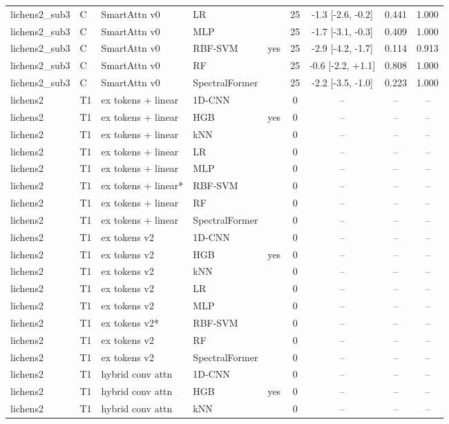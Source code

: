 \begin{tabular}{lllllcccc}
lichens2_sub3 & C & SmartAttn v0 & LR &  & 25 & -1.3 [-2.6, -0.2] & 0.441 & 1.000 \\
lichens2_sub3 & C & SmartAttn v0 & MLP &  & 25 & -1.7 [-3.1, -0.3] & 0.409 & 1.000 \\
lichens2_sub3 & C & SmartAttn v0 & RBF-SVM & yes & 25 & -2.9 [-4.2, -1.7] & 0.114 & 0.913 \\
lichens2_sub3 & C & SmartAttn v0 & RF &  & 25 & -0.6 [-2.2, +1.1] & 0.808 & 1.000 \\
lichens2_sub3 & C & SmartAttn v0 & SpectralFormer &  & 25 & -2.2 [-3.5, -1.0] & 0.223 & 1.000 \\
lichens2 & T1 & ex tokens + linear & 1D-CNN &  & 0 & -- & -- & -- \\
lichens2 & T1 & ex tokens + linear & HGB & yes & 0 & -- & -- & -- \\
lichens2 & T1 & ex tokens + linear & kNN &  & 0 & -- & -- & -- \\
lichens2 & T1 & ex tokens + linear & LR &  & 0 & -- & -- & -- \\
lichens2 & T1 & ex tokens + linear & MLP &  & 0 & -- & -- & -- \\
lichens2 & T1 & ex tokens + linear* & RBF-SVM &  & 0 & -- & -- & -- \\
lichens2 & T1 & ex tokens + linear & RF &  & 0 & -- & -- & -- \\
lichens2 & T1 & ex tokens + linear & SpectralFormer &  & 0 & -- & -- & -- \\
lichens2 & T1 & ex tokens v2 & 1D-CNN &  & 0 & -- & -- & -- \\
lichens2 & T1 & ex tokens v2 & HGB & yes & 0 & -- & -- & -- \\
lichens2 & T1 & ex tokens v2 & kNN &  & 0 & -- & -- & -- \\
lichens2 & T1 & ex tokens v2 & LR &  & 0 & -- & -- & -- \\
lichens2 & T1 & ex tokens v2 & MLP &  & 0 & -- & -- & -- \\
lichens2 & T1 & ex tokens v2* & RBF-SVM &  & 0 & -- & -- & -- \\
lichens2 & T1 & ex tokens v2 & RF &  & 0 & -- & -- & -- \\
lichens2 & T1 & ex tokens v2 & SpectralFormer &  & 0 & -- & -- & -- \\
lichens2 & T1 & hybrid conv attn & 1D-CNN &  & 0 & -- & -- & -- \\
lichens2 & T1 & hybrid conv attn & HGB & yes & 0 & -- & -- & -- \\
lichens2 & T1 & hybrid conv attn & kNN &  & 0 & -- & -- & -- \\

\end{tabular}
